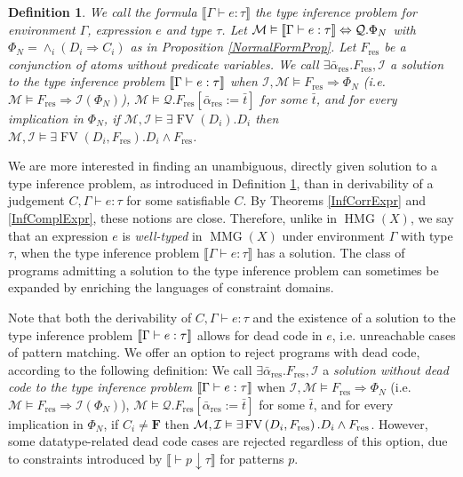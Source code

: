 \documentclass{article}
\newcommand{\assign}{:=}
\newcommand{\nobracket}{}
\newcommand{\tmem}[1]{{\em #1\/}}
\newcommand{\tmmathbf}[1]{\ensuremath{\boldsymbol{#1}}}
\newcommand{\tmop}[1]{\ensuremath{\operatorname{#1}}}
\newtheorem{definition}{Definition}
{\theorembodyfont{\rmfamily}\newtheorem{example}{Example}}
\begin{document}
\begin{definition}
  \label{SolTypInfer}We call the formula $\llbracket \Gamma \vdash e : \tau
  \rrbracket$ the {\tmem{type inference problem}} for environment $\Gamma$,
  expression $e$ and type $\tau$. Let $\mathcal{M} \vDash \left\llbracket
  \Gamma \vdash e : {\nobreak} \tau \right\rrbracket \Leftrightarrow
  \mathcal{Q}. \Phi_N$ with $\Phi_N = \wedge_i (D_i \Rightarrow C_i)$ as in
  Proposition \ref{NormalFormProp}. Let $F_{\tmop{res}}$ be a conjunction of
  atoms without predicate variables. We call $\exists
  \bar{\alpha}_{\tmop{res}} .F_{\tmop{res}}, \mathcal{I}$ a {\tmem{solution to
  the type inference problem}} $\left\llbracket \Gamma \vdash e : {\nobreak}
  \tau \right\rrbracket$ when $\mathcal{I}, \mathcal{M} \vDash F_{\tmop{res}}
  \Rightarrow \Phi_N$ (i.e. $\mathcal{M} \vDash F_{\tmop{res}} \Rightarrow
  \mathcal{I} (\Phi_N)$), $\mathcal{M} \vDash \mathcal{Q}.F_{\tmop{res}}
  [\bar{\alpha}_{\tmop{res}} \assign \bar{t}]$ for some $\bar{t}$, and for
  every implication in $\Phi_N$, if $\mathcal{M}, \mathcal{I} \vDash \exists
  \tmop{FV} (D_i) .D_i$ then $\mathcal{M}, \mathcal{I} \vDash \exists
  \tmop{FV} (D_i, F_{\tmop{res}}) .D_i \wedge F_{\tmop{res}}$.
\end{definition}

We are more interested in finding an unambiguous, directly given solution to a
type inference problem, as introduced in Definition \ref{SolTypInfer}, than in
derivability of a judgement $C, \Gamma \vdash e : \tau$ for some satisfiable
$C$. By Theorems \ref{InfCorrExpr} and \ref{InfComplExpr}, these notions are
close. Therefore, unlike in $\tmop{HMG} (X)$, we say that an expression $e$ is
{\tmem{well-typed}} in $\tmop{MMG} (X)$ under environment $\Gamma$ with type
$\tau$, when the type inference problem $\llbracket \Gamma \vdash e : \tau
\rrbracket$ has a solution. The class of programs admitting a solution to the
type inference problem can sometimes be expanded by enriching the languages of
constraint domains.

Note that both the derivability of $C, \Gamma \vdash e : \tau$ and the
existence of a solution to the type inference problem $\left\llbracket \Gamma
\vdash e : {\nobreak} \tau \right\rrbracket$ allows for dead code in $e$, i.e.
unreachable cases of pattern matching. We offer an option to reject programs
with dead code, according to the following definition: We call $\exists
\bar{\alpha}_{\tmop{res}} .F_{\tmop{res}}, \mathcal{I}$ a {\tmem{solution
without dead code to the type inference problem}} $\left\llbracket \Gamma
\vdash e : {\nobreak} \tau \right\rrbracket$ when $\mathcal{I}, \mathcal{M}
\vDash F_{\tmop{res}} \Rightarrow \Phi_N$ (i.e. $\mathcal{M} \vDash
F_{\tmop{res}} \Rightarrow \mathcal{I} (\Phi_N)$), $\mathcal{M} \vDash
\mathcal{Q}.F_{\tmop{res}} [\bar{\alpha}_{\tmop{res}} \assign \bar{t}]$ for
some $\bar{t}$, and for every implication in $\Phi_N$, if $C_i \neq
\tmmathbf{F}$ then $\mathcal{M}, \mathcal{I} \vDash \exists \tmop{FV} \left(
D_i, {\nobreak} F_{\tmop{res}} \right) .D_i \wedge {\nobreak} F_{\tmop{res}}$.
However, some datatype-related dead code cases are rejected regardless of this
option, due to constraints introduced by $\llbracket \vdash p \downarrow \tau
\rrbracket \nobracket \nobracket$ for patterns $p$.
\end{document}
